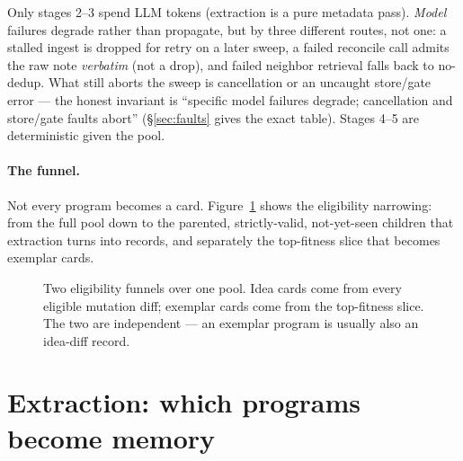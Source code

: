 \documentclass[11pt]{article}
\newcommand{\code}[1]{\texttt{\small #1}}
\begin{document}
Only stages 2--3 spend LLM tokens (extraction is a pure metadata pass). \emph{Model}
failures degrade rather than propagate, but by three different routes, not one: a
stalled ingest is dropped for retry on a later sweep, a failed reconcile call admits
the raw note \emph{verbatim} (not a drop), and failed neighbor retrieval falls back
to no-dedup. What still aborts the sweep is cancellation or an uncaught store/gate
error --- the honest invariant is ``specific model failures degrade; cancellation and
store/gate faults abort'' (\S\ref{sec:faults} gives the exact table). Stages 4--5 are
deterministic given the pool.

\paragraph{The funnel.} Not every program becomes a card. Figure~\ref{fig:funnel}
shows the eligibility narrowing: from the full pool down to the parented,
strictly-valid, not-yet-seen children that extraction turns into records, and
separately the top-fitness slice that becomes exemplar cards.

\begin{figure}[ht]
\centering
{}
\caption{Two eligibility funnels over one pool. Idea cards come from every
eligible mutation diff; exemplar cards come from the top-fitness slice. The two
are independent --- an exemplar program is usually also an idea-diff record.}
\label{fig:funnel}
\end{figure}

\section{Extraction: which programs become memory}
\label{sec:extract}
\end{document}
